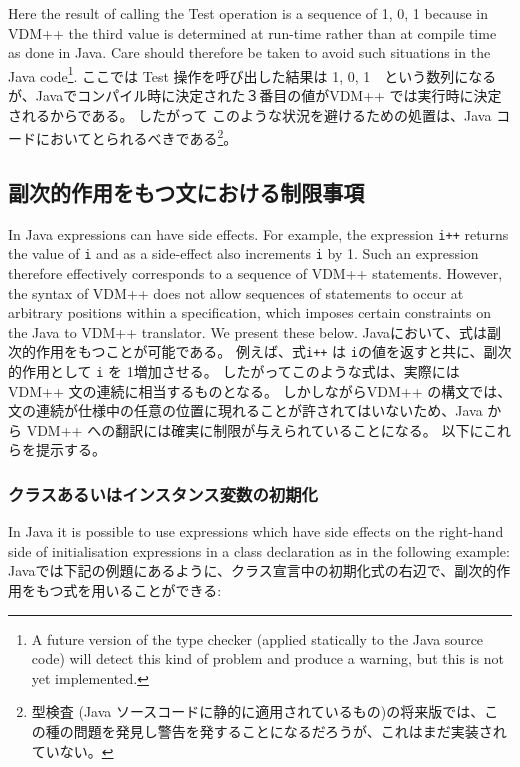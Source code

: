 \documentclass[\pformat,12pt]{jarticle}
\begin{document}
Here the result of calling the Test operation is a sequence of 1, 0, 1
because in VDM++ the third value is determined at run-time rather
than at compile time as done in Java. Care should therefore be taken
to avoid such situations in the Java code\footnote{A future version
  of the type checker (applied statically to the Java source code)
  will detect this kind of problem and produce a warning, but this is 
not yet implemented.}.
ここでは Test 操作を呼び出した結果は 1, 0, 1　という数列になるが、Javaでコンパイル時に決定された３番目の値がVDM++ では実行時に決定されるからである。 
したがって このような状況を避けるための処置は、Java コードにおいてとられるべきである\footnote{型検査 (Java ソースコードに静的に適用されているもの)の将来版では、この種の問題を発見し警告を発することになるだろうが、これはまだ実装されていない。}。


\subsection{副次的作用をもつ文における制限事項}

In Java expressions can have side effects. For example, the expression
\texttt{i++} returns the value of \texttt{i} and as a side-effect also
increments \texttt{i} by 1. Such an expression therefore effectively
corresponds to a sequence of VDM++ statements. However, the syntax of
VDM++ does not allow sequences of statements to occur at arbitrary
positions within a specification, which imposes certain constraints on
the Java to VDM++ translator. We present these below.
Javaにおいて、式は副次的作用をもつことが可能である。
例えば、式\texttt{i++} は \texttt{i}の値を返すと共に、副次的作用として \texttt{i} を 1増加させる。 
したがってこのような式は、実際には VDM++ 文の連続に相当するものとなる。
しかしながらVDM++ の構文では、文の連続が仕様中の任意の位置に現れることが許されてはいないため、Java から VDM++ への翻訳には確実に制限が与えられていることになる。
以下にこれらを提示する。

\subsubsection{クラスあるいはインスタンス変数の初期化}

In Java it is possible to use expressions which have side effects on
the right-hand side of initialisation expressions in a class
declaration as in the following example:
Javaでは下記の例題にあるように、クラス宣言中の初期化式の右辺で、副次的作用をもつ式を用いることができる:
\end{document}
